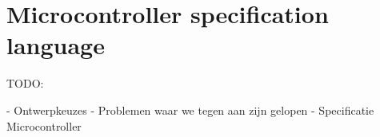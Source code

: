\chapter[Grammar explanation]{Microcontroller specification language}
\label{Microcontroller specification language}



TODO:

- Ontwerpkeuzes
- Problemen waar we tegen aan zijn gelopen
- Specificatie Microcontroller
